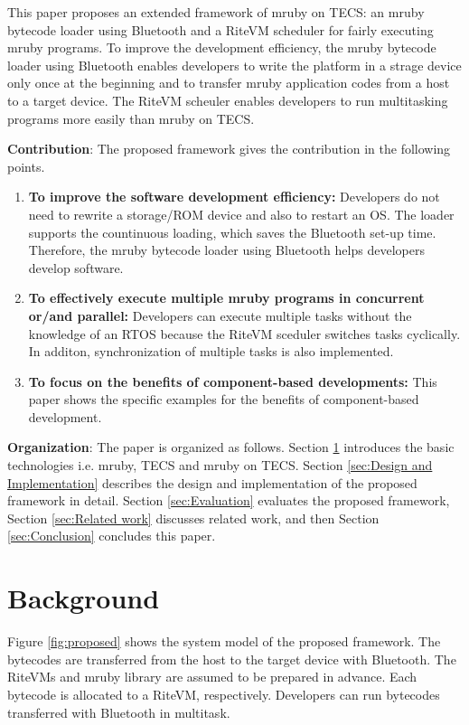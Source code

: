 \documentclass[conference,compsoc]{IEEEtran}
\begin{document}
This paper proposes an extended framework of mruby on TECS: an mruby bytecode loader using Bluetooth and a RiteVM scheduler for fairly executing mruby programs.
To improve the development efficiency, the mruby bytecode loader using Bluetooth enables developers to write the platform in a strage device only once at the beginning and to transfer mruby application codes from a host to a target device.
The RiteVM scheuler enables developers to run multitasking programs more easily than mruby on TECS.

{\bf Contribution}: The proposed framework gives the contribution in the following points.
\begin{enumerate}
\item {\bf To improve the software development efficiency:} Developers do not need to rewrite a storage/ROM device and also to restart an OS.
The loader supports the countinuous loading, which saves the Bluetooth set-up time.
Therefore, the mruby bytecode loader using Bluetooth helps developers develop software.
\item {\bf To effectively execute multiple mruby programs in concurrent or/and parallel:} Developers can execute multiple tasks without the knowledge of an RTOS because the RiteVM sceduler switches tasks cyclically.
In additon, synchronization of multiple tasks is also implemented.
\item {\bf To focus on the benefits of component-based developments:} This paper shows the specific examples for the benefits of component-based development. 
\end{enumerate}

{\bf Organization}: The paper is organized as follows.
Section \ref{sec:Background} introduces the basic technologies i.e. mruby, TECS and mruby on TECS.
Section \ref{sec:Design and Implementation} describes the design and implementation of the proposed framework in detail.
Section \ref{sec:Evaluation} evaluates the proposed framework, Section \ref{sec:Related work} discusses related work, and then Section \ref{sec:Conclusion} concludes this paper.

\section{Background}
\label{sec:Background}
Figure \ref{fig:proposed} shows the system model of the proposed framework.
The bytecodes are transferred from the host to the target device with Bluetooth.
The RiteVMs and mruby library are assumed to be prepared in advance.
Each bytecode is allocated to a RiteVM, respectively.
Developers can run bytecodes transferred with Bluetooth in multitask.
\end{document}
